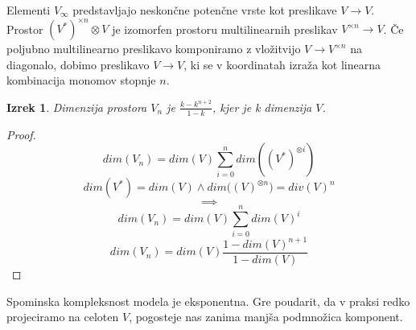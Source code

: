 \documentclass{article}
\newtheorem{izrek}{Izrek}[section]
\begin{document}
Elementi $V_\infty$ predstavljajo neskončne potenčne vrste kot preslikave 
$V\to V$. Prostor $(V^*)^{\times n}\otimes V$ je izomorfen prostoru
multilinearnih preslikav $V^{\times n}\to V$. Če poljubno
multilinearno preslikavo komponiramo z vložitvijo $V\to V^{\times n}$ na
diagonalo, dobimo preslikavo $V\to V$, ki se v koordinatah izraža kot linearna
kombinacija monomov stopnje $n$.

\begin{izrek}
 Dimenzija prostora $V_n$ je $\frac{k-k^{n+2}}{1-k}$, kjer je k dimenzija $V$.
 \end{izrek}

\begin{proof}
	$$dim(V_n)=dim(V)\sum\limits_{i=0}^{n}dim((V^*)^{\otimes i})$$
	$$dim(V^*)=dim(V)\land dim\Big((V)^{\otimes n}\Big)=div(V)^n$$
	$$\implies$$
	$$dim(V_n)=dim(V)\sum\limits_{i=0}^{n}dim(V)^{i}$$
	$$dim(V_n)=dim(V)\frac{1-dim(V)^{n+1}}{1-dim(V)}$$
\end{proof}

Spominska kompleksnost modela je eksponentna. Gre poudarit, da v praksi redko projeciramo na celoten $V$, pogosteje nas zanima manjša podmnožica komponent.
\end{document}
